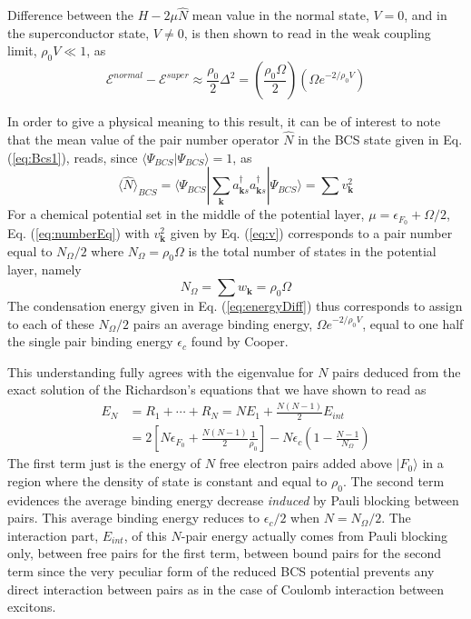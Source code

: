 \documentclass[aps,prb,preprint,groupedaddress,amsmath]{revtex4-1}
\newcommand{\vk}{\ensuremath{\mathbf{k}}}
\newcommand{\dg}{\ensuremath{\dagger}}
\begin{document}
Difference between the $H-2\mu\hat{N}$ mean value in the normal state, $V=0$, and in the superconductor state, $V\neq0$, is then shown to read in the weak coupling limit, $\rho_0V\ll1$, as
\begin{equation}\label{eq:energyDiff}
\mathcal{E}^{normal}-\mathcal{E}^{super}\approx\frac{\rho_0}{2}\Delta^2=(\frac{\rho_0\Omega}{2})(\Omega{}e^{-2/\rho_0V})
\end{equation}

In order to give a physical meaning to this result, it can be of interest to note that the  mean value of the pair number operator $\hat{N}$ in the BCS state given in Eq. (\ref{eq:Bcs1}), reads, since $\langle\Psi_{BCS}|\Psi_{BCS}\rangle=1$, as
\begin{equation}\label{eq:numberEq}
\langle{\hat{N}}{\rangle}_{BCS}={\langle\Psi_{BCS}|\sum_\vk{a^\dg_{\vk{}s}{}a^\dg_{\vk{}s}}|\Psi_{BCS}{\rangle}}
=\sum{v_\vk^2}
\end{equation}
For a chemical potential set in the middle of the potential layer,
 $\mu=\epsilon_{F_0}+\Omega/2$, Eq. (\ref{eq:numberEq}) with $v_\vk^2$ given by Eq. (\ref{eq:v}) corresponds to  a pair number  equal to $N_\Omega/2$ where $N_{\Omega}=\rho_0\Omega$ is the total number of states  in the potential layer, namely 
\begin{equation}
 N_\Omega=\sum{w_\vk}=\rho_0\Omega
\end{equation}
 The  condensation energy given in Eq. (\ref{eq:energyDiff}) thus corresponds to assign to each of these $N_\Omega/2$ pairs  an average binding energy, $\Omega{}e^{-2/\rho_0V}$, equal to one half the single pair binding energy $\epsilon_c$ found by Cooper. 

This understanding fully agrees with the  eigenvalue for $N$ pairs deduced from the exact solution of the Richardson's equations that we have shown to read as
\begin{equation}
\begin{split}
E_N&=R_1+\cdots+R_N=NE_1+\frac{N(N-1)}2E_{int}\\
&=2\left[N\epsilon_{F_0}+\frac{N(N-1)}2\frac{1}{\rho_0}\right]-N\epsilon_c(1-\frac{N-1}{N_\Omega})
\end{split}
\end{equation}
The first term just is the energy of $N$ free electron pairs added above $|F_0{\rangle}$ in a region where the density of state is constant and equal to $\rho_0$.  The second term evidences the average binding energy decrease \emph{induced} by Pauli blocking between pairs.    This average binding energy reduces to $\epsilon_c/2$ when $N=N_{\Omega}/2$.  The interaction part, $E_{int}$, of this $N$-pair energy actually comes from Pauli blocking only, between free pairs for the first term, between bound pairs for the second term since the very peculiar form of the reduced BCS potential prevents any direct interaction between pairs as in the case of Coulomb interaction between excitons.  
\end{document}
